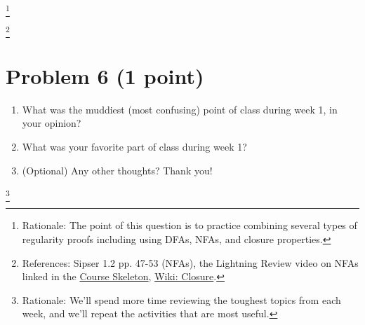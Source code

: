\documentclass[letterpaper,11pt,twoside]{article}
\theoremstyle{plain}
\theoremstyle{definition}
\theoremstyle{remark}
\theoremstyle{restate}
\newcommand\blfootnote[1]{%
  \begingroup
  \renewcommand\thefootnote{}\footnote{#1}%
  \addtocounter{footnote}{-1}%
  \endgroup
}
\begin{document}
\blfootnote{Rationale: The point of this question is to practice combining several types of regularity proofs including using DFAs, NFAs, and closure properties. }
\blfootnote{References: Sipser 1.2 pp. 47-53 (NFAs), the Lightning Review video on NFAs linked in the \href{https://docs.google.com/document/d/1PHCNkMitYsMpbh-sxrBmr-cGbpUEshfdFDS2k09fHrI}{Course Skeleton}, \href{https://en.wikipedia.org/wiki/Closure_(mathematics)}{Wiki: Closure}. }


\clearpage
\section{Problem 6 (1 point)}
    \begin{enumerate}
        \item What was the muddiest (most confusing) point of class during week 1, in your opinion?
        
        \item What was your favorite part of class during week 1?
        
        \item (Optional) Any other thoughts? Thank you!
    \end{enumerate}

\blfootnote{Rationale: We'll spend more time reviewing the toughest topics from each week, and we'll repeat the activities that are most useful. }
\end{document}

